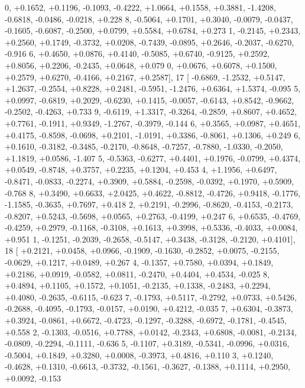 \begin{DoxyCode}
      0, +0.1652, +0.1196, -0.1093, -0.4222, +1.0664, +0.1558, +0.3881, -1.4208, -0.6818, -0.0486, -0.0218, +0.228
      8, -0.5064, +0.1701, +0.3040, -0.0079, -0.0437, -0.1605, -0.6087, -0.2500, +0.0799, +0.5584, +0.6784, +0.273
      1, -0.2145, +0.2343, +0.2560, +0.1749, -0.3732, +0.0208, -0.7439, -0.0895, +0.2646, -0.2037, -0.6270, -0.916
      6, +0.4650, +0.0876, +0.4140, -0.5085, +0.6740, -0.9125, +0.2592, +0.8056, +0.2206, -0.2435, +0.0648, +0.079
      0, +0.0676, +0.6078, +0.1500, +0.2579, +0.6270, -0.4166, +0.2167, +0.2587],
17 [ -0.6869, -1.2532, +0.5147, +1.2637, -0.2554, +0.8228, +0.2481, -0.5951, -1.2476, +0.6364, +1.5374, -0.095
      5, +0.0997, -0.6819, +0.2029, -0.6230, +0.1415, -0.0057, -0.6143, +0.8542, -0.9662, -0.2502, -0.4263, +0.733
      9, -0.6119, +1.3317, -0.3264, -0.2859, +0.8607, +0.4652, +0.7761, -0.1911, +0.9349, -1.2767, -0.3979, -0.144
      6, +0.3565, +0.0987, +0.4651, +0.4175, -0.8598, -0.0698, +0.2101, -1.0191, +0.3386, -0.8061, +0.1306, +0.249
      6, +0.1610, -0.3182, -0.3485, -0.2170, -0.8648, -0.7257, -0.7880, -1.0330, -0.2050, +1.1819, +0.0586, -1.407
      5, -0.5363, -0.6277, +0.4401, +0.1976, -0.0799, +0.4374, +0.0549, -0.8748, +0.3757, +0.2235, +0.1204, +0.453
      4, +1.1956, +0.6497, -0.8471, -0.0833, -0.2274, +0.3909, +0.5884, -0.2598, -0.0392, +0.1970, +0.5909, -0.768
      8, +0.3490, +0.6633, +2.0425, +0.4622, -0.8812, -0.4726, +0.9418, -0.1776, -1.1585, -0.3635, +0.7697, +0.418
      2, +0.2191, -0.2996, -0.8620, -0.4153, -0.2173, -0.8207, +0.5243, -0.5698, +0.0565, +0.2763, -0.4199, +0.247
      6, +0.6535, -0.4769, -0.4259, +0.2979, -0.1168, -0.3108, +0.1613, +0.3998, +0.5336, -0.4033, +0.0084, +0.951
      1, -0.1251, -0.2039, -0.2658, -0.5147, +0.3438, -0.3128, -0.2120, +0.4101],
18 [ +0.2121, +0.0458, +0.0966, -0.1909, -0.1630, -0.2852, +0.0075, -0.2155, -0.0629, +0.1217, +0.0489, +0.267
      4, -0.1357, +0.7580, +0.0394, +0.1849, +0.2186, +0.0919, -0.0582, +0.0811, -0.2470, +0.4404, +0.4534, -0.025
      8, +0.4894, +0.1105, +0.1572, +0.1051, -0.2135, +0.1338, -0.2483, +0.2294, +0.4080, -0.2635, -0.6115, -0.623
      7, -0.1793, +0.5117, -0.2792, +0.0733, +0.5426, -0.2688, -0.4095, -0.1793, -0.0157, +0.0190, +0.4212, -0.035
      7, +0.6304, -0.3873, +0.3924, -0.0861, +0.6672, -0.4723, -0.1297, -0.3288, -0.6972, -0.1781, -0.4545, +0.558
      2, -0.1303, -0.0516, +0.7788, +0.0142, -0.2343, +0.6808, -0.0081, -0.2134, -0.0809, -0.2294, -0.1111, -0.636
      5, -0.1107, +0.3189, -0.5341, -0.0996, +0.0316, -0.5004, +0.1849, +0.3280, +0.0008, -0.3973, +0.4816, +0.110
      3, +0.1240, -0.4628, +0.1310, -0.6613, -0.3732, -0.1561, -0.3627, -0.1388, +0.1114, +0.2950, +0.0092, -0.153

\end{DoxyCode}
